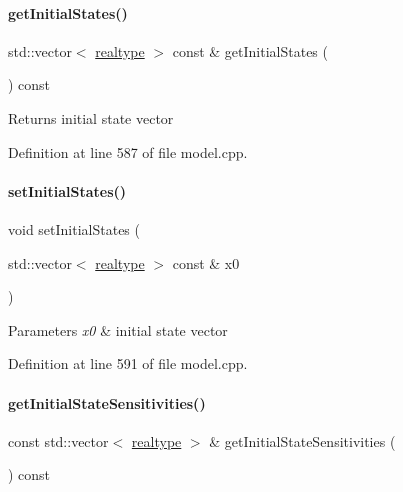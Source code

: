\paragraph{\texorpdfstring{get\+Initial\+States()}{getInitialStates()}}
{\footnotesize\ttfamily std\+::vector$<$ \mbox{\hyperlink{namespaceamici_a1bdce28051d6a53868f7ccbf5f2c14a3}{realtype}} $>$ const  \& get\+Initial\+States (\begin{DoxyParamCaption}{ }\end{DoxyParamCaption}) const}

\begin{DoxyReturn}{Returns}
initial state vector 
\end{DoxyReturn}


Definition at line 587 of file model.\+cpp.

\mbox{\label{classamici_1_1_model_ada7cb3dadf4cee4b8fd6f092fee54b3c}} 
\paragraph{\texorpdfstring{set\+Initial\+States()}{setInitialStates()}}
{\footnotesize\ttfamily void set\+Initial\+States (\begin{DoxyParamCaption}\item[{std\+::vector$<$ \mbox{\hyperlink{namespaceamici_a1bdce28051d6a53868f7ccbf5f2c14a3}{realtype}} $>$ const \&}]{x0 }\end{DoxyParamCaption})}


\begin{DoxyParams}{Parameters}
{\em x0} & initial state vector \\
\hline
\end{DoxyParams}


Definition at line 591 of file model.\+cpp.

\mbox{\label{classamici_1_1_model_a989b8202ceac7b6f94bb1503519a56fb}} 
\paragraph{\texorpdfstring{get\+Initial\+State\+Sensitivities()}{getInitialStateSensitivities()}}
{\footnotesize\ttfamily const std\+::vector$<$ \mbox{\hyperlink{namespaceamici_a1bdce28051d6a53868f7ccbf5f2c14a3}{realtype}} $>$ \& get\+Initial\+State\+Sensitivities (\begin{DoxyParamCaption}{ }\end{DoxyParamCaption}) const}

